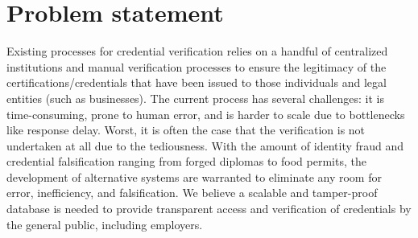 \section{Problem statement}

Existing processes for credential verification relies on a handful of centralized institutions and manual verification processes to ensure the legitimacy of the certifications/credentials that have been issued to those individuals and legal entities (such as businesses). The current process has several challenges: it is time-consuming, prone to human error, and is harder to scale due to bottlenecks like response delay. Worst, it is often the case that the verification is not undertaken at all due to the tediousness. With the amount of identity fraud and credential falsification ranging from forged diplomas to food permits, the development of alternative systems are warranted to eliminate any room for error, inefficiency, and falsification. We believe a scalable and tamper-proof database is needed to provide transparent access and verification of credentials by the general public, including employers.
